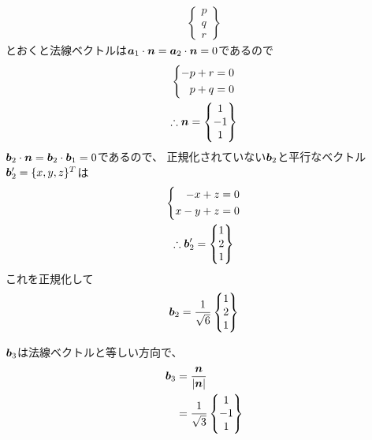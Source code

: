 \begin{ans*}
\begin{other*}
\begin{gather}
\begin{Bmatrix}
        p \\ q \\ r
      \end{Bmatrix}
    \end{gather}
    とおくと法線ベクトルは${\bm{a}}_1\cdot{\bm{n}}={\bm{a}}_2\cdot{\bm{n}}=0$であるので
    \begin{gather}
      \left\{
      \begin{aligned}
        -p + r &= 0 \\
        p + q &= 0
      \end{aligned}
      \right.
      \\
      \therefore {\bm{n}} =
      \begin{Bmatrix}
        1 \\ -1 \\ 1
      \end{Bmatrix}
    \end{gather}
    ${\bm{b}}_2\cdot{\bm{n}}={\bm{b}}_2\cdot{\bm{b}}_1=0$であるので、
    正規化されていない${\bm{b}}_2$と平行なベクトル${\bm{b}}'_2 = \{x, y, z\}^T$は
    \begin{gather}
      \left\{
      \begin{aligned}
        -x + z &= 0 \\
        x - y + z &= 0
      \end{aligned}
      \right.
      \\
      \therefore {\bm{b}}'_2 =
      \begin{Bmatrix}
        1 \\ 2 \\ 1
      \end{Bmatrix}
    \end{gather}
    これを正規化して
    \begin{gather}
      {\bm{b}}_2 = 
      \frac{1}{\sqrt{6}}
      \begin{Bmatrix}
        1 \\ 2 \\ 1
      \end{Bmatrix}
    \end{gather}

    ${\bm{b}}_3$は法線ベクトルと等しい方向で、
    \begin{align}
      {\bm{b}}_3 
      &= \frac{{\bm{n}}}{|{\bm{n}}|} \\
      &= \frac{1}{\sqrt{3}}
      \begin{Bmatrix}
        1 \\ -1 \\ 1
      \end{Bmatrix}
    \end{align}
  \end{other*}
\end{ans*}

